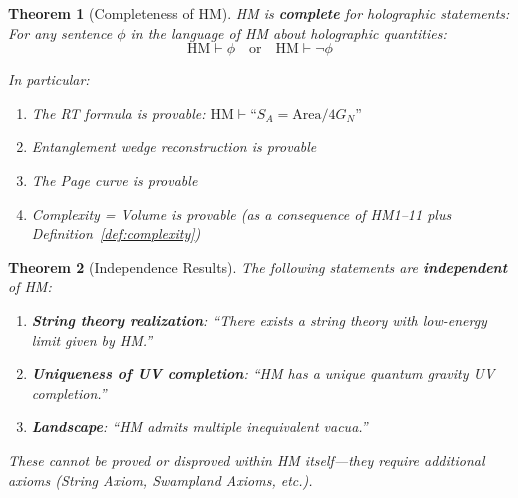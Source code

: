 \documentclass[12pt,a4paper]{article}
\newtheorem{theorem}{Theorem}[section]
\begin{document}
\begin{theorem}[Completeness of HM]\label{thm:hm-completeness}
HM is \textbf{complete} for holographic statements: For any sentence $\phi$ in the language of HM about holographic quantities:
\begin{equation}
\text{HM} \vdash \phi \quad \text{or} \quad \text{HM} \vdash \neg\phi
\end{equation}

In particular:
\begin{enumerate}
    \item The RT formula is provable: $\text{HM} \vdash \text{``}S_A = \text{Area}/4G_N\text{''}$
    \item Entanglement wedge reconstruction is provable
    \item The Page curve is provable
    \item Complexity = Volume is provable (as a consequence of HM1--11 plus Definition~\ref{def:complexity})
\end{enumerate}
\end{theorem}

\begin{theorem}[Independence Results]\label{thm:hm-independence}
The following statements are \textbf{independent} of HM:
\begin{enumerate}
    \item \textbf{String theory realization}: ``There exists a string theory with low-energy limit given by HM.''
    \item \textbf{Uniqueness of UV completion}: ``HM has a unique quantum gravity UV completion.''
    \item \textbf{Landscape}: ``HM admits multiple inequivalent vacua.''
\end{enumerate}

These cannot be proved or disproved within HM itself---they require additional axioms (String Axiom, Swampland Axioms, etc.).
\end{theorem}
\end{document}

